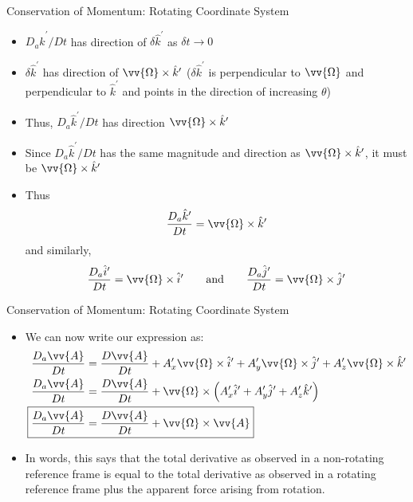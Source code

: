 \begin{frame}{Conservation of Momentum: Rotating Coordinate System}
\begin{itemize}
	\item $D_a\hat k^\prime / Dt$ has direction of $\delta \hat k^\prime$ as $\delta t\rightarrow 0$
	\item $\delta \hat k^\prime$ has direction of $\vv{\Omega} \times \hat k^\prime$ ($\delta \hat k^\prime$ is perpendicular to $\vv{\Omega}$ and perpendicular to $\hat k^\prime$ and points in the direction of increasing $\theta$)
	\item Thus, $D_a\hat k^\prime / Dt$ has direction $\vv{\Omega} \times \hat k^\prime$
	\item Since $D_a\hat k^\prime / Dt$ has the same magnitude and direction as $\vv{\Omega} \times \hat k^\prime$, it must be $\vv{\Omega} \times \hat k^\prime$
	\item Thus
	$$\frac{D_a \hat k^\prime}{Dt} = \vv{\Omega} \times \hat k^\prime$$
	and similarly,
	$$\frac{D_a \hat i^\prime}{Dt} = \vv{\Omega} \times \hat i^\prime \qquad \text{and} \qquad \frac{D_a \hat j^\prime}{Dt} = \vv{\Omega} \times \hat j^\prime$$
\end{itemize}
\end{frame}
\begin{frame}{Conservation of Momentum: Rotating Coordinate System}
\begin{itemize}
	\item We can now write our expression as:
	\begin{align*}
	\frac{D_a\vv{A}}{Dt} &= \frac{D\vv{A}}{Dt} + A_x^\prime \vv{\Omega} \times \hat i^\prime +A_y^\prime \vv{\Omega} \times \hat j^\prime +A_z^\prime \vv{\Omega} \times \hat k^\prime\\
	\frac{D_a\vv{A}}{Dt} &= \frac{D\vv{A}}{Dt} + \vv{\Omega} \times \left(A_x^\prime \hat i^\prime + A_y^\prime \hat j^\prime + A_z^\prime \hat k^\prime\right)\\
	\Aboxed{\frac{D_a\vv{A}}{Dt} &= \frac{D\vv{A}}{Dt} + \vv{\Omega} \times \vv{A}}
	\end{align*}
	\item In words, this says that the total derivative as observed in a non-rotating reference frame is equal to the total derivative as observed in a rotating reference frame plus the apparent force arising from rotation.
\end{itemize}
\end{frame}
